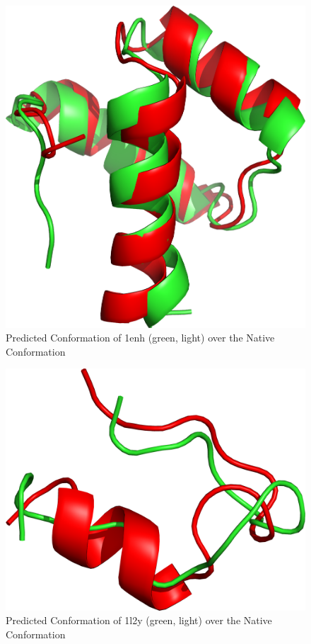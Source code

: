 \begin{figure}[ht]
    \centering
    \includegraphics[width=0.9\linewidth]{Figuras/prots/1enh_render.png}
    \caption{Predicted Conformation of 1enh (green, light) over the Native Conformation}
    \label{fig:1enh-visual}
\end{figure}

\begin{figure}[ht]
    \centering
    \includegraphics[width=0.9\linewidth]{Figuras/prots/1l2y_render.png}
    \caption{Predicted Conformation of 1l2y (green, light) over the Native Conformation}
    \label{fig:1l2y-visual}
\end{figure}

